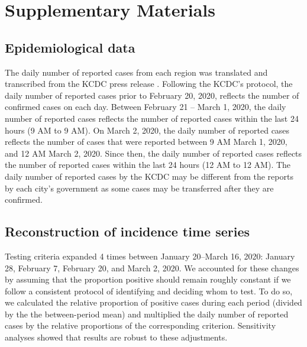 \renewcommand\thefigure{S\arabic{figure}}
\setcounter{figure}{0}    

\section*{Supplementary Materials}

\subsection*{Epidemiological data}

The daily number of reported cases from each region was translated and transcribed from the KCDC press release \citep{kcdc}.
Following the KCDC's protocol, the daily number of reported cases prior to February 20, 2020, reflects the number of confirmed cases on each day.
Between February 21 -- March 1, 2020, the daily number of reported cases reflects the number of reported cases within the last 24 hours (9 AM to 9 AM).
On March 2, 2020, the daily number of reported cases reflects the number of cases that were reported between 9 AM March 1, 2020, and 12 AM March 2, 2020.
Since then, the daily number of reported cases reflects the number of reported cases within the last 24 hours (12 AM to 12 AM).
The daily number of reported cases by the KCDC may be different from the reports by each city's government as some cases may be transferred after they are confirmed.

\subsection*{Reconstruction of incidence time series}

Testing criteria expanded 4 times between January 20--March 16, 2020: January 28, February 7, February 20, and March 2, 2020.
We accounted for these changes by assuming that the proportion positive should remain roughly constant if we follow a consistent protocol of identifying and deciding whom to test.
To do so, we calculated the relative proportion of positive cases during each period (divided by the the between-period mean) and multiplied the daily number of reported cases by the relative proportions of the corresponding criterion.
Sensitivity analyses showed that results are robust to these adjustments.


